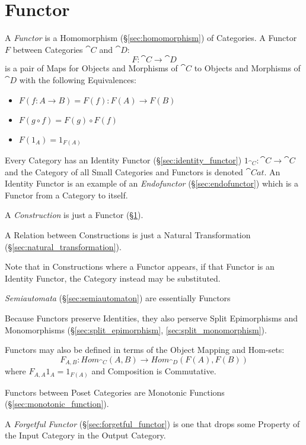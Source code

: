 \section{Functor}\label{sec:functor}

A \emph{Functor} is a Homomorphism (\S\ref{sec:homomorphism}) of
Categories. A Functor $F$ between Categories $\cat{C}$ and $\cat{D}$:
\[
  F : \cat{C} \rightarrow \cat{D}
\]
is a pair of Maps for Objects and Morphisms of $\cat{C}$ to Objects
and Morphisms of $\cat{D}$ with the following Equivalences:
\begin{itemize}
\item $F(f : A \rightarrow B) = F(f) : F(A) \rightarrow F(B)$
\item $F(g \circ f) = F(g) \circ F(f)$
\item $F(1_A) = 1_{F(A)}$
\end{itemize}
Every Category has an Identity Functor (\S\ref{sec:identity_functor})
$1_{\cat{C}} : \cat{C} \rightarrow \cat{C}$ and the Category
of all Small Categories and Functors is denoted $\cat{Cat}$. An
Identity Functor is an example of an \emph{Endofunctor}
(\S\ref{sec:endofunctor}) which is a Functor from a Category to
itself.

A \emph{Construction} is just a Functor (\S\ref{sec:functor}).

A Relation between Constructions is just a Natural Transformation
(\S\ref{sec:natural_transformation}).

\fist Note that in Constructions where a Functor appears, if
that Functor is an Identity Functor, the Category instead may be
substituted.

\fist \emph{Semiautomata} (\S\ref{sec:semiautomaton}) are essentially
Functors

Because Functors preserve Identities, they also perserve Split
Epimorphisms and Monomorphisms (\S\ref{sec:split_epimorphism},
\ref{sec:split_monomorphism}).

Functors may also be defined in terms of the Object Mapping and
Hom-sets:
\[
  F_{A,B} : Hom_{\cat{C}}(A,B) \rightarrow Hom_{\cat{D}}(F(A),F(B))
\]
where $F_{A,A}1_A = 1_{F(A)}$ and Composition is Commutative.

Functors between Poset Categories are Monotonic Functions
(\S\ref{sec:monotonic_function}).

A \emph{Forgetful Functor} (\S\ref{sec:forgetful_functor}) is one that
drops some Property of the Input Category in the Output Category.

